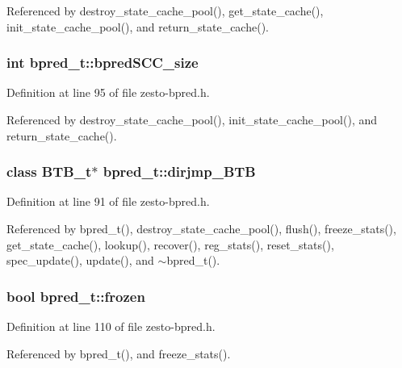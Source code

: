 Referenced by destroy\_\-state\_\-cache\_\-pool(), get\_\-state\_\-cache(), init\_\-state\_\-cache\_\-pool(), and return\_\-state\_\-cache().
\subsubsection[{bpredSCC\_\-size}]{\setlength{\rightskip}{0pt plus 5cm}int {\bf bpred\_\-t::bpredSCC\_\-size}\hspace{0.3cm}{\tt  [protected]}}\label{classbpred__t_020bbd24e0522b6a82b7e571c175b4b0}




Definition at line 95 of file zesto-bpred.h.

Referenced by destroy\_\-state\_\-cache\_\-pool(), init\_\-state\_\-cache\_\-pool(), and return\_\-state\_\-cache().
\subsubsection[{dirjmp\_\-BTB}]{\setlength{\rightskip}{0pt plus 5cm}class {\bf BTB\_\-t}$\ast$ {\bf bpred\_\-t::dirjmp\_\-BTB}\hspace{0.3cm}{\tt  [protected]}}\label{classbpred__t_5371b500167cc248dabd8a3244713a82}




Definition at line 91 of file zesto-bpred.h.

Referenced by bpred\_\-t(), destroy\_\-state\_\-cache\_\-pool(), flush(), freeze\_\-stats(), get\_\-state\_\-cache(), lookup(), recover(), reg\_\-stats(), reset\_\-stats(), spec\_\-update(), update(), and $\sim$bpred\_\-t().
\subsubsection[{frozen}]{\setlength{\rightskip}{0pt plus 5cm}bool {\bf bpred\_\-t::frozen}\hspace{0.3cm}{\tt  [protected]}}\label{classbpred__t_fc29e92b0c869eafc6065952c99d7063}




Definition at line 110 of file zesto-bpred.h.

Referenced by bpred\_\-t(), and freeze\_\-stats().
